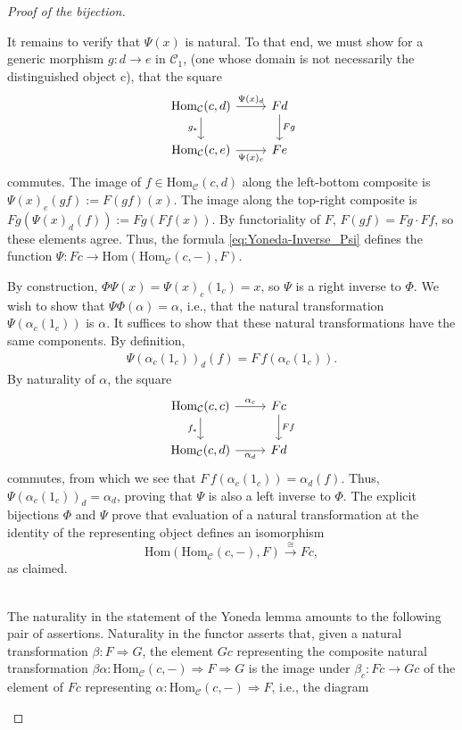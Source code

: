\begin{proof}[Proof of the bijection]
\begin{subproof}[\nopunct]
It remains to verify that $\Psi(x)$ is natural. To that end, we must show for a generic morphism $g : d \rightarrow e$ in $\mathcal{C}_{1}$, (one
whose domain is not necessarily the distinguished object c), that the square
\[
\begin{tikzcd}
{\mathrm{Hom}_{\mathcal{C}}(c,d)} \arrow[r, "\Psi(x)_{d}"] \arrow[d, "g_{*}"'] & Fd \arrow[d, "Fg"] \\
{\mathrm{Hom}_{\mathcal{C}}(c,e)} \arrow[r, "\Psi(x)_{e}"']                    & Fe                
\end{tikzcd}
\]
commutes. The image of $f \in \mathrm{Hom}_{\mathcal{C}}(c,d)$ along the left-bottom composite is
$\Psi(x)_{e}(gf) := F(gf)(x)$. The image along the top-right composite is $Fg(\Psi(x)_{d}(f)) := Fg(Ff(x))$. By functoriality of $F$,
$F(gf) = Fg \cdot Ff$, so these elements agree. Thus, the formula \eqref{eq:Yoneda-Inverse_Psi} defines the function
$\Psi : Fc \rightarrow \mathrm{Hom}(\mathrm{Hom}_{\mathcal{C}}(c,-),F)$.

By construction, $\Phi\Psi(x) = \Psi(x)_{c}(1_{c}) = x$, so $\Psi$ is a right inverse to $\Phi$. We wish to show that
$\Psi\Phi(\alpha) = \alpha$, i.e., that the natural transformation $\Psi(\alpha_{c}(1_{c}))$ is $\alpha$. It suffices to show that
these natural transformations have the same components. By definition,
\begin{align*}
\Psi(\alpha_{c}(1_{c}))_{d}(f) = F\,f(\alpha_{c}(1_{c})).
\end{align*}
By naturality of $\alpha$, the square
\begin{align}
\begin{tikzcd}[ampersand replacement = \&]
{\mathrm{Hom}_{\mathcal{C}}(c,c)} \arrow[r, "\alpha_{c}"] \arrow[d, "f_{*}"'] \& Fc \arrow[d, "Ff"] \\
{\mathrm{Hom}_{\mathcal{C}}(c,d)} \arrow[r, "\alpha_{d}"']                    \& Fd                
\end{tikzcd}
\end{align}
commutes, from which we see that $F\,f(\alpha_{c}(1_{c})) = \alpha_{d}(f)$. Thus, $\Psi(\alpha_{c}(1_{c}))_{d} = \alpha_{d}$,
proving that $\Psi$ is also a left inverse to $\Phi$. The explicit bijections $\Phi$ and $\Psi$ prove that evaluation of a natural
transformation at the identity of the representing object defines an isomorphism
\[
\mathrm{Hom}(\mathrm{Hom}_{\mathcal{C}}(c,-), F)  \xrightarrow{\cong} Fc,
\]
as claimed.
\end{subproof}
\begin{subproof}\phantom{}\\
The naturality in the statement of the Yoneda lemma amounts to the following pair of assertions. Naturality in the functor
asserts that, given a natural transformation $\beta : F \Rightarrow G$, the element $Gc$ representing the composite natural transformation
$\beta\alpha : \mathrm{Hom}_{\mathcal{C}}(c,-) \Rightarrow F \Rightarrow G$ is the image under $\beta_{c} : Fc \rightarrow Gc$ of the element
of $Fc$ representing $\alpha : \mathrm{Hom}_{\mathcal{C}}(c,-) \Rightarrow F$, i.e., the diagram
\[

\]
\end{subproof}
\end{proof}
